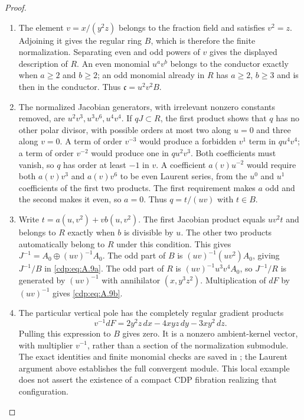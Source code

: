\begin{proof}

\begin{enumerate}[label={$\langle1\rangle$\arabic*.},leftmargin=*]
\item The element $v=x/(y^2z)$ belongs to the fraction field and satisfies $v^2=z$. Adjoining it gives the regular ring $B$, which is therefore the finite normalization. Separating even and odd powers of $v$ gives the displayed description of $R$. An even monomial $u^av^b$ belongs to the conductor exactly when $a\ge2$ and $b\ge2$; an odd monomial already in $R$ has $a\ge2$, $b\ge3$ and is then in the conductor. Thus $\mathfrak c=u^2v^2B$.

\item The normalized Jacobian generators, with irrelevant nonzero constants removed, are $u^2v^3,u^3v^6,u^4v^4$. If $qJ\subset R$, the first product shows that $q$ has no other polar divisor, with possible orders at most two along $u=0$ and three along $v=0$. A term of order $v^{-3}$ would produce a forbidden $v^1$ term in $qu^4v^4$; a term of order $v^{-2}$ would produce one in $qu^2v^3$. Both coefficients must vanish, so $q$ has order at least $-1$ in $v$. A coefficient $a(v)u^{-2}$ would require both $a(v)v^3$ and $a(v)v^6$ to be even Laurent series, from the $u^0$ and $u^1$ coefficients of the first two products. The first requirement makes $a$ odd and the second makes it even, so $a=0$. Thus $q=t/(uv)$ with $t\in B$.

\item Write $t=a(u,v^2)+v b(u,v^2)$. The first Jacobian product equals $uv^2t$ and belongs to $R$ exactly when $b$ is divisible by $u$. The other two products automatically belong to $R$ under this condition. This gives $J^{-1}=A_0\oplus(uv)^{-1}A_0$. The odd part of $B$ is $(uv)^{-1}(uv^2)A_0$, giving $J^{-1}/B$ in \eqref{cdp:eq:A.9a}. The odd part of $R$ is $(uv)^{-1}u^3v^4A_0$, so $J^{-1}/R$ is generated by $(uv)^{-1}$ with annihilator $(x,y^3z^2)$. Multiplication of $dF$ by $(uv)^{-1}$ gives \eqref{cdp:eq:A.9b}.

\item The particular vertical pole has the completely regular gradient products
\[
 v^{-1}dF=2y^2z\,dx-4xyz\,dy-3xy^2\,dz.
\]
Pulling this expression to $B$ gives zero. It is a nonzero ambient-kernel vector, with multiplier $v^{-1}$, rather than a section of the normalization submodule. The exact identities and finite monomial checks are saved in ; the Laurent argument above establishes the full convergent module. This local example does not assert the existence of a compact CDP fibration realizing that configuration.

\end{enumerate}
\end{proof}
